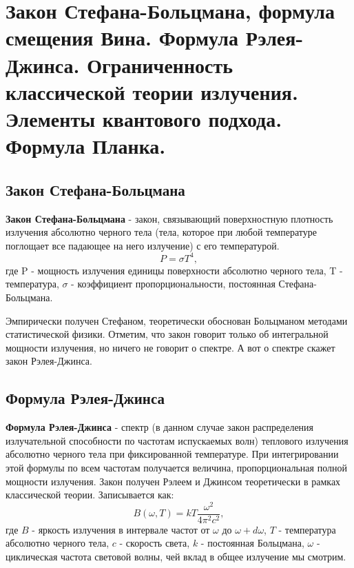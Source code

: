 \section{Закон Стефана-Больцмана, формула смещения Вина. Формула Рэлея-Джинса. Ограниченность классической теории излучения. Элементы квантового подхода. Формула Планка. }


\subsection{Закон Стефана-Больцмана}
\textbf{Закон Стефана-Больцмана} - закон, связывающий поверхностную плотность излучения абсолютно черного тела (тела, которое при любой температуре поглощает все падающее на него излучение) с его температурой.
\begin{equation}
    P = \sigma T^4,
\end{equation}
где P - мощность излучения единицы поверхности абсолютно черного тела, T - температура, \(\sigma\)  - коэффициент пропорциональности, постоянная Стефана-Больцмана.


Эмпирически получен Стефаном, теоретически обоснован Больцманом методами статистической физики. Отметим, что закон говорит только об интегральной мощности излучения, но ничего не говорит о спектре. А вот о спектре скажет закон Рэлея-Джинса.


\subsection{Формула Рэлея-Джинса}
\textbf{Формула Рэлея-Джинса} - спектр (в данном случае закон распределения излучательной способности по частотам испускаемых волн) теплового излучения абсолютно черного тела при фиксированной температуре. При интегрировании этой формулы по всем частотам получается величина, пропорциональная полной мощности излучения. Закон получен Рэлеем и Джинсом теоретически в рамках классической теории. Записывается как:
\begin{equation}
\label{rj}
    B(\omega, T) = kT\frac{\omega^2}{4\pi^2 c^2},
\end{equation}
где \(B\) - яркость излучения в интервале частот от \(\omega\) до \(\omega + d\omega\), \(T\) - температура абсолютно черного тела, \(c\) - скорость света, \(k\) - постоянная Больцмана, \(\omega\) - циклическая частота световой волны, чей вклад в общее излучение мы смотрим.

